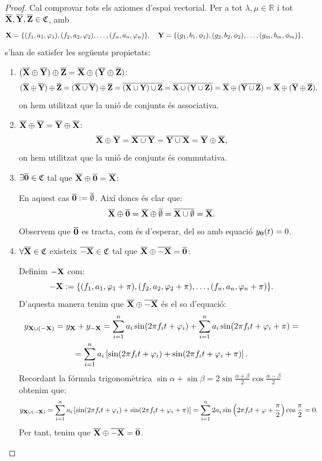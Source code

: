 \documentclass{article}
\theoremstyle{math}
\newcommand{\0}{\ensuremath{\vb{0}}}
\newcommand{\X}{\ensuremath{\vb{X}}}
\newcommand{\Y}{\ensuremath{\vb{Y}}}
\newcommand{\Z}{\ensuremath{\vb{Z}}}
\newcommand{\RR}{\ensuremath{\mathbb{R}}} %
\begin{document}
\begin{proof}
    Cal comprovar tots els axiomes d'espai vectorial. Per a tot $\lambda,\mu\in\RR$ i tot $\overline{\X},\overline{\Y},\overline{\Z}\in\mathfrak{C}$, amb $$\X=\{(f_1,a_1,\varphi_1),(f_2,a_2,\varphi_2),\ldots,(f_n,a_n,\varphi_n)\},\quad\Y=\{(g_1,b_1,\phi_1),(g_2,b_2,\phi_2),\ldots,(g_m,b_m,\phi_m)\},$$  s'han de satisfer les següents propietats:
    \begin{enumerate}
        \item $(\overline{\X}\oplus \overline{\Y})\oplus \overline{\Z}=\overline{\X}\oplus (\overline{\Y}\oplus \overline{\Z})$:
        $$(\overline{\X}\oplus \overline{\Y})\oplus \overline{\Z}=(\overline{\X\cup\Y})\oplus \overline{\Z}=\overline{(\X\cup\Y)\cup\Z}=\overline{\X\cup(\Y\cup\Z)}=\overline{\X}\oplus(\overline{\Y\cup\Z})=\overline{\X}\oplus (\overline{\Y}\oplus \overline{\Z}),$$ on hem utilitzat que la unió de conjunts és associativa.
        \item $\overline{\X}\oplus \overline{\Y}=\overline{\Y}\oplus \overline{\X}$:
        $$\overline{\X}\oplus \overline{\Y}=\overline{\X\cup\Y}=\overline{\Y\cup\X}=\overline{\Y}\oplus \overline{\X},$$ on hem utilitzat que la unió de conjunts és commutativa.
        \item $\exists \overline{\0}\in\mathfrak{C}$ tal que $\overline{\X}\oplus\overline{\0}=\overline{\X}$:\par
        En aquest cas $\overline{\0}:=\overline{\emptyset}$. Així doncs és clar que: $$\overline{\X}\oplus\overline{\0}=\overline{\X}\oplus\overline{\emptyset}=\overline{\X\cup\emptyset}=\overline{\X}.$$ Observem que $\overline{\0}$ es tracta, com és d'esperar, del so amb equació $y_{\0}(t)=0$.
        \item $\forall \overline{\X}\in\mathfrak{C}$ existeix $\overline{-\X}\in\mathfrak{C}$ tal que $\overline{\X}\oplus\overline{-\X}=\overline{\0}$:\par
        Definim $-\X$ com: $$-\X:=\{(f_1,a_1,\varphi_1+\pi),(f_2,a_2,\varphi_2+\pi),\ldots,(f_n,a_n,\varphi_n+\pi)\}.$$ D'aquesta manera tenim que $\overline{\X}\oplus\overline{-\X}$ és el so d'equació:
        \begin{multline*}
            y_{\X\cup(-\X)}=y_{\X}+y_{-\X}=\sum_{i=1}^na_i\sin(2\pi f_it+\varphi_i)+\sum_{i=1}^na_i\sin(2\pi f_it+\varphi_i+\pi)=\\=\sum_{i=1}^na_i\left[\sin(2\pi f_it+\varphi_i)+\sin(2\pi f_it+\varphi_i+\pi)\right].
        \end{multline*}
        Recordant la fórmula trigonomètrica $\sin\alpha+\sin\beta=2\sin\frac{\alpha+\beta}{2}\cos\frac{\alpha-\beta}{2}$ obtenim que: $$y_{\X\cup(-\X)}=\sum_{i=1}^na_i\left[\sin(2\pi f_it+\varphi_i)+\sin(2\pi f_it+\varphi_i+\pi)\right]=\sum_{i=1}^n2a_i\sin\left(2\pi f_it+\varphi +\frac{\pi}{2}\right)\cos\frac{\pi}{2}=0.$$ Per tant, tenim que $\overline{\X}\oplus\overline{-\X}=\overline{\0}$.

\end{enumerate}
\end{proof}
\end{document}
